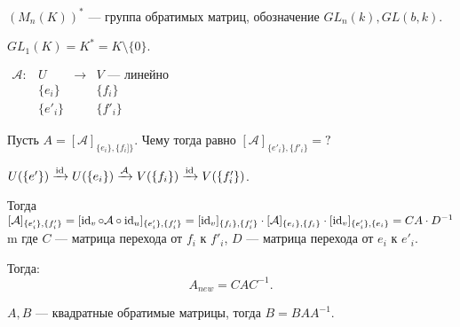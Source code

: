 $\left(M_n(K)\right)^*$ --- группа обратимых матриц, обозначение  $GL_n(k), GL(b, k)$.

\begin{example}
    $GL_1(K) = K^* = K \setminus \{0\}$.
\end{example}

$\begin{array}{llll} \mathcal{A}\!: & U & \to & V\text{ --- линейно} \\ & \{e_i\} && \{f_i\} \\ & \{e'_i\} && \{f'_i\} \end{array}$

Пусть  $A = [\mathcal{A}]_{\{e_i\}, \{f_i]\}}$. Чему тогда равно  $[\mathcal{A}]_{\{e'_i\}, \{f'_i\}} = ?$

$U (\{e'\}) \xrightarrow{\operatorname{id}} U(\{e_i\}) \xrightarrow{\mathcal{A}} V (\{f_i\}) \xrightarrow{\operatorname{id}} V(\{f'_i\})$.

Тогда  $[\mathcal{A}]_{\{e'_i\}, \{f'_i\}} = [\operatorname{id}_v \circ \mathcal{A} \circ \operatorname{id}_u]_{\{e'_i\}, \{f'_i\}} = [\operatorname{id}_v]_{\{f_i\}, \{f'_i\}} \cdot [\mathcal{A}]_{\{e_i\}, \{f_i\}} \cdot [\operatorname{id}_v]_{\{e'_i\}, \{e_i\}} = C A \cdot D^{-1}$m где  $C$ --- матрица перехода от  $f_i$ к  $f'_i$,  $D$ --- матрица перехода  от $e_i$ к  $e'_i$.

Тогда:  \[
    A_{new} = C A C^{-1}
.\]

$A, B$ --- квадратные обратимые матрицы, тогда  $B = B A A^{-1}$.

